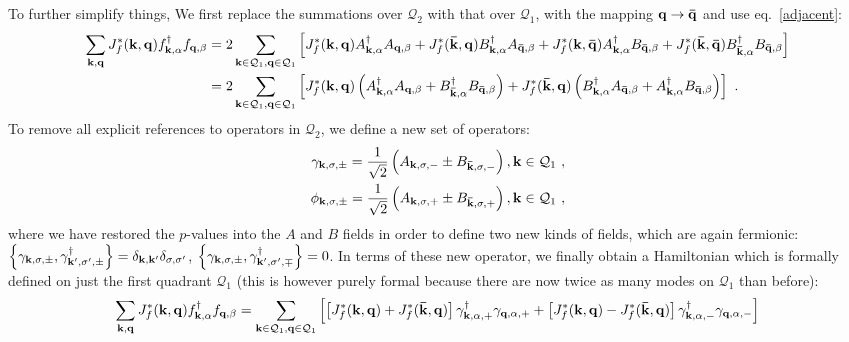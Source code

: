 \documentclass[%
reprint,
superscriptaddress,
groupedaddress,
superscriptaddress,
onecolumn,
]{revtex4-2}
\begin{document}
To further simplify things, We first replace the summations over \(\mathcal{Q}_2\) with that over \(\mathcal{Q}_1\), with the mapping \({\bf q} \to {\bf \bar q}\) and use eq.~\ref{adjacent}:
\begin{equation}\begin{aligned}
	\sum_{{\bf k}, {\bf q}} J_f^*({\bf k},{\bf q}) f^\dagger_{{\bf k},\alpha}f_{{\bf q},\beta} 
	&= 2\sum_{{\bf k} \in \mathcal{Q}_1, {\bf q} \in \mathcal{Q}_1} \left[J_f^*({\bf k},{\bf q}) A^\dagger_{{\bf k},\alpha}A_{{\bf q},\beta} + J_f^*({\bf \bar k},{\bf q}) B^\dagger_{{\bf k},\alpha}A_{{\bf \bar q},\beta} + J_f^*({\bf k},{\bf \bar q}) A^\dagger_{{\bf k},\alpha}B_{{\bf \bar q},\beta} + J_f^*({\bf \bar k},{\bf \bar q}) B^\dagger_{{\bf \bar k},\alpha}B_{{\bf \bar q},\beta}\right]\\
	&= 2\sum_{{\bf k} \in \mathcal{Q}_1, {\bf q} \in \mathcal{Q}_1} \left[J_f^*({\bf k},{\bf q}) \left(A^\dagger_{{\bf k},\alpha}A_{{\bf q},\beta} + B^\dagger_{{\bf \bar k},\alpha}B_{{\bf \bar q},\beta}\right) + J_f^*({\bf \bar k},{\bf q}) \left(B^\dagger_{{\bf k},\alpha}A_{{\bf \bar q},\beta} + A^\dagger_{{\bf k},\alpha}B_{{\bf \bar q},\beta}\right)\right] ~.
\end{aligned}\end{equation}
To remove all explicit references to operators in \(\mathcal{Q}_2\), we define a new set of operators:
\begin{equation}\begin{aligned}\label{defineGamma}
	\gamma_{{\bf k},\sigma,\pm} = \frac{1}{\sqrt{2}}\left(A_{{\bf k},\sigma,-} \pm B_{{\bf \bar k},\sigma,-}\right), {\bf k}\in \mathcal{Q}_1~,\\
	\phi_{{\bf k},\sigma,\pm} = \frac{1}{\sqrt{2}}\left(A_{{\bf k},\sigma,+} \pm B_{{\bf \bar k},\sigma,+}\right), {\bf k}\in \mathcal{Q}_1~,
\end{aligned}\end{equation}
where we have restored the \(p\)-values into the \(A\) and \(B\) fields in order to define two new kinds of fields, which are again fermionic: \(\left\{\gamma_{{\bf k},\sigma,\pm}, \gamma_{{\bf k}^\prime,\sigma^\prime,\pm}^\dagger\right\} = \delta_{{\bf k},{\bf k}^\prime}\delta_{\sigma,\sigma^\prime}\), \(\left\{\gamma_{{\bf k},\sigma,\pm}, \gamma_{{\bf k}^\prime,\sigma^\prime,\mp}^\dagger\right\} = 0\). In terms of these new operator, we finally obtain a Hamiltonian which is formally defined on just the first quadrant \(\mathcal{Q}_1\) (this is however purely formal because there are now twice as many modes on \(\mathcal{Q}_1\) than before):
\begin{equation}\begin{aligned}
	\sum_{{\bf k}, {\bf q}} J_f^*({\bf k},{\bf q}) f^\dagger_{{\bf k},\alpha}f_{{\bf q},\beta} 
	&= \sum_{{\bf k} \in \mathcal{Q}_1, {\bf q} \in \mathcal{Q}_1} \left[\left[J_f^*({\bf k},{\bf q}) + J_f^*({\bf \bar k},{\bf q})\right] \gamma^\dagger_{{\bf k},\alpha,+}\gamma_{{\bf q},\alpha,+} + \left[J_f^*({\bf k},{\bf q}) - J_f^*({\bf \bar k},{\bf q})\right] \gamma^\dagger_{{\bf k},\alpha,-}\gamma_{{\bf q},\alpha,-}\right] \\
\end{aligned}\end{equation}
\end{document}
